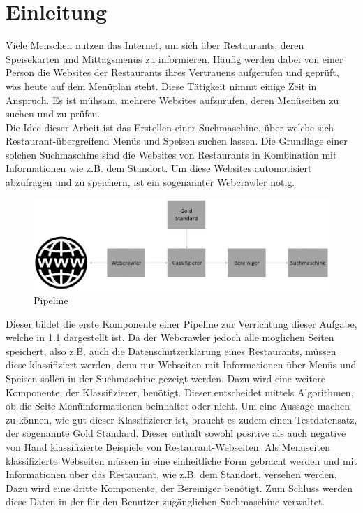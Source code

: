 \chapter{Einleitung}
Viele Menschen nutzen das Internet, um sich über Restaurants, deren Speisekarten und Mittagsmenüs zu informieren.
Häufig werden dabei von einer Person die Websites der Restaurants ihres Vertrauens aufgerufen und geprüft, was heute auf dem Menüplan steht.
Diese Tätigkeit nimmt einige Zeit in Anspruch.
Es ist mühsam, mehrere Websites aufzurufen, deren Menüseiten zu suchen und zu prüfen.\\
Die Idee dieser Arbeit ist das Erstellen einer Suchmaschine, über welche sich Restaurant-übergreifend Menüs und Speisen suchen lassen.
Die Grundlage einer solchen Suchmaschine sind die Websites von Restaurants in Kombination mit Informationen wie z.B. dem Standort.
Um diese Websites automatisiert abzufragen und zu speichern, ist ein sogenannter Webcrawler nötig.
\begin{figure}[H]
	\centering	
	\includegraphics[width=1\columnwidth,keepaspectratio]{img/Ablauf_Einleitung.png}
	\caption{Pipeline}
	\label{fig:ablauf_einleitung}
\end{figure}
Dieser bildet die erste Komponente einer Pipeline zur Verrichtung dieser Aufgabe, welche in \cref{fig:ablauf_einleitung} dargestellt ist.
Da der Webcrawler jedoch alle möglichen Seiten speichert, also z.B. auch die Datenschutzerklärung eines Restaurants, müssen diese klassifiziert werden, denn nur Webseiten mit Informationen über Menüs und Speisen sollen in der Suchmaschine gezeigt werden.
Dazu wird eine weitere Komponente, der Klassifizierer, benötigt.
Dieser entscheidet mittels Algorithmen, ob die Seite Menüinformationen beinhaltet oder nicht.
Um eine Aussage machen zu können, wie gut dieser Klassifizierer ist, braucht es zudem einen Testdatensatz, der sogenannte Gold Standard.
Dieser enthält sowohl positive als auch negative von Hand klassifizierte Beispiele von Restaurant-Webseiten.
Als Menüseiten klassifizierte Webseiten müssen in eine einheitliche Form gebracht werden und mit Informationen über das Restaurant, wie z.B. dem Standort, versehen werden.
Dazu wird eine dritte Komponente, der Bereiniger benötigt.
Zum Schluss werden diese Daten in der für den Benutzer zugänglichen Suchmaschine verwaltet.  

